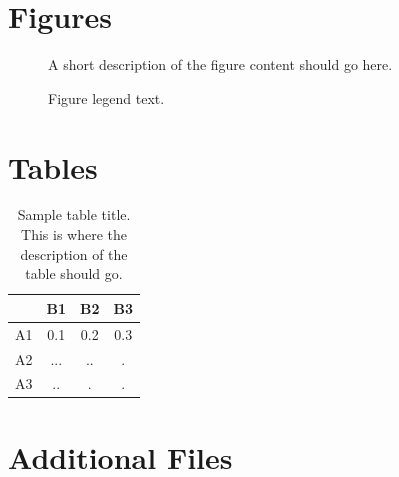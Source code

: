 \documentclass[twocolumn]{bmcart}
\begin{document}
\begin{backmatter}


\section*{Figures}
  \begin{figure}[h!]
  \caption{
      A short description of the figure content
      should go here.}
      \end{figure}

\begin{figure}[h!]
  \caption{
      Figure legend text.}
      \end{figure}


\section*{Tables}
\begin{table}[h!]
\caption{Sample table title. This is where the description of the table should go.}
      \begin{tabular}{cccc}
        \hline
           & B1  &B2   & B3\\ \hline
        A1 & 0.1 & 0.2 & 0.3\\
        A2 & ... & ..  & .\\
        A3 & ..  & .   & .\\ \hline
      \end{tabular}
\end{table}


\section*{Additional Files}

\end{backmatter}
\end{document}
